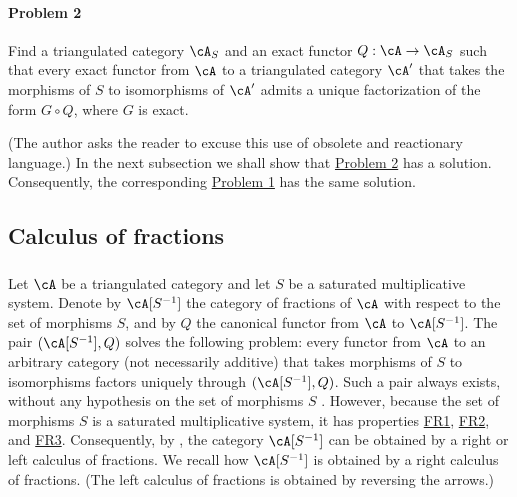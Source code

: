 \paragraph{Problem 2}
\hypertarget{VIII:prob2}{}
Find a triangulated category $\cA_S$ and an exact functor
$Q:\cA\to \cA_S$ such that every exact functor from $\cA$ to a
triangulated category $\cA'$ that takes the morphisms of $S$ to
isomorphisms of $\cA'$ admits a unique factorization of the form
$G\circ Q$, where $G$ is exact.

(The author asks the reader to excuse this use of obsolete and reactionary
language.) In the next subsection we shall show that
\hyperlink{VIII:prob2}{Problem 2} has a solution. Consequently, the
corresponding \hyperlink{VIII:prob1}{Problem 1} has the same solution.

\subsection{Calculus of fractions}\label{VIII:2-3}

\subsubsection{}\label{VIII:2-3-1}

Let $\cA$ be a triangulated category and let $S$ be a saturated
multiplicative system. Denote by $\cA[S^{-1}]$ the category of fractions
of $\cA$ with respect to the set of morphisms $S$, and by $Q$ the
canonical functor from $\cA$ to $\cA[S^{-1}]$. The pair
$(\cA[S^{-1}],Q)$ solves the following problem: every functor from $\cA$
to an arbitrary category (not necessarily additive) that takes morphisms
of $S$ to isomorphisms factors uniquely through $(\cA[S^{-1}],Q)$. Such
a pair always exists, without any hypothesis on the set of morphisms $S$
. However, because the
set of morphisms $S$ is a saturated multiplicative system, it has
properties \hyperlink{VIII:FR1}{FR1}, \hyperlink{VIII:FR2}{FR2}, and
\hyperlink{VIII:FR3}{FR3}. Consequently, by , the category
$\cA[S^{-1}]$ can be obtained by a right or left calculus of fractions.
We recall how $\cA[S^{-1}]$ is obtained by a right calculus of fractions.
(The left calculus of fractions is obtained by reversing the arrows.)

\subsubsection{}\label{VIII:2-3-2}

